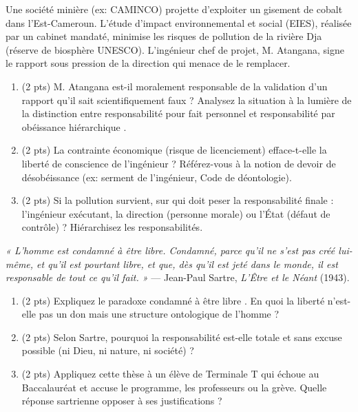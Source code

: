 \documentclass[11pt]{article}
\begin{document}
\begin{exercice}
Une société minière (ex: CAMINCO) projette d'exploiter un gisement de cobalt dans l'Est-Cameroun. L'étude d'impact environnemental et social (EIES), réalisée par un cabinet mandaté, minimise les risques de pollution de la rivière Dja (réserve de biosphère UNESCO). L'ingénieur chef de projet, M. Atangana, signe le rapport sous pression de la direction qui menace de le remplacer.
\begin{enumerate}
    \item (2 pts) M. Atangana est-il moralement responsable de la validation d'un rapport qu'il sait scientifiquement faux ? Analysez la situation à la lumière de la distinction entre \og responsabilité pour fait personnel \fg{} et \og responsabilité par obéissance hiérarchique \fg{}.
    \item (2 pts) La \og contrainte économique \fg{} (risque de licenciement) efface-t-elle la liberté de conscience de l'ingénieur ? Référez-vous à la notion de \og devoir de désobéissance \fg{} (ex: serment de l'ingénieur, Code de déontologie).
    \item (2 pts) Si la pollution survient, sur qui doit peser la responsabilité finale : l'ingénieur exécutant, la direction (personne morale) ou l'État (défaut de contrôle) ? Hiérarchisez les responsabilités.
\end{enumerate}
\end{exercice}

\begin{exercice}
\textit{« L'homme est condamné à être libre. Condamné, parce qu'il ne s'est pas créé lui-même, et qu'il est pourtant libre, et que, dès qu'il est jeté dans le monde, il est responsable de tout ce qu'il fait. »} — Jean-Paul Sartre, \textit{L'Être et le Néant} (1943).
\begin{enumerate}
    \item (2 pts) Expliquez le paradoxe \og condamné à être libre \fg{}. En quoi la liberté n'est-elle pas un don mais une structure ontologique de l'homme ?
    \item (2 pts) Selon Sartre, pourquoi la responsabilité est-elle \og totale \fg{} et sans excuse possible (ni Dieu, ni nature, ni société) ?
    \item (2 pts) Appliquez cette thèse à un élève de Terminale T qui échoue au Baccalauréat et accuse le programme, les professeurs ou la grève. Quelle réponse sartrienne opposer à ses justifications ?
\end{enumerate}
\end{exercice}
\end{document}
